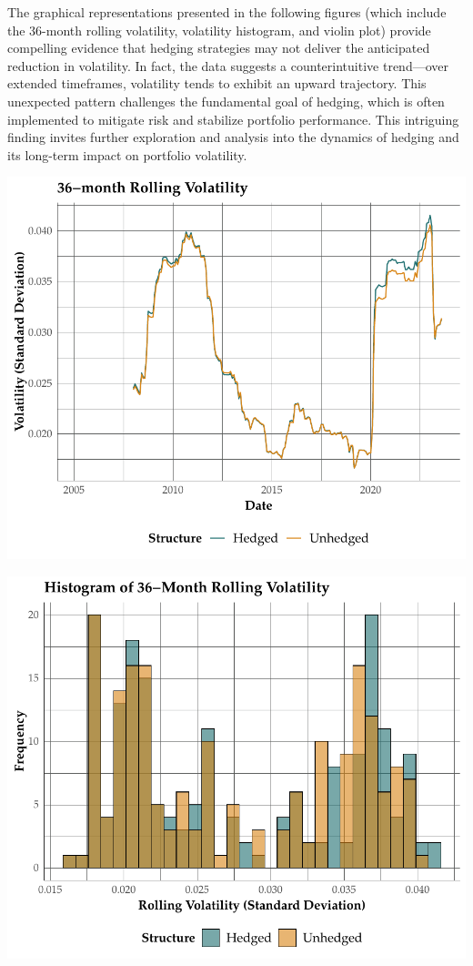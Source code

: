 \documentclass[11pt,preprint, authoryear]{elsarticle}
\numberwithin{equation}{section}
\numberwithin{figure}{section}
\numberwithin{table}{section}
\begin{document}
The graphical representations presented in the following figures (which
include the 36-month rolling volatility, volatility histogram, and
violin plot) provide compelling evidence that hedging strategies may not
deliver the anticipated reduction in volatility. In fact, the data
suggests a counterintuitive trend---over extended timeframes, volatility
tends to exhibit an upward trajectory. This unexpected pattern
challenges the fundamental goal of hedging, which is often implemented
to mitigate risk and stabilize portfolio performance. This intriguing
finding invites further exploration and analysis into the dynamics of
hedging and its long-term impact on portfolio volatility.

\includegraphics{Question-2_files/figure-latex/rolling-ret-1.pdf}

\includegraphics{Question-2_files/figure-latex/histogram-1.pdf}
\end{document}
